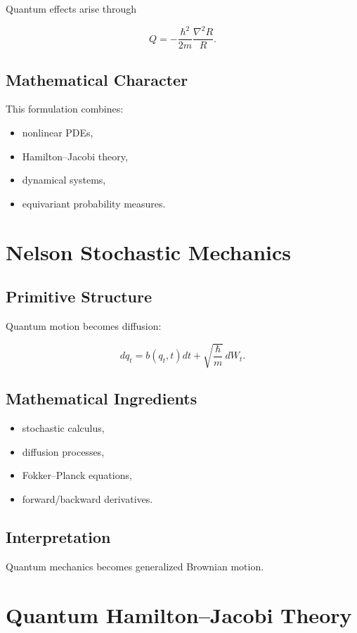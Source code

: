 \documentclass[11pt]{article}
\begin{document}
Quantum effects arise through

\[
Q
=
-
\frac{\hbar^2}{2m}
\frac{\nabla^2R}{R}.
\]

\subsection{Mathematical Character}

This formulation combines:

\begin{itemize}
\item nonlinear PDEs,
\item Hamilton--Jacobi theory,
\item dynamical systems,
\item equivariant probability measures.
\end{itemize}

\section{Nelson Stochastic Mechanics}

\subsection{Primitive Structure}

Quantum motion becomes diffusion:

\[
dq_t
=
b(q_t,t)dt
+
\sqrt{\frac{\hbar}{m}}\, dW_t.
\]

\subsection{Mathematical Ingredients}

\begin{itemize}
\item stochastic calculus,
\item diffusion processes,
\item Fokker--Planck equations,
\item forward/backward derivatives.
\end{itemize}

\subsection{Interpretation}

Quantum mechanics becomes generalized Brownian motion.

\section{Quantum Hamilton--Jacobi Theory}
\end{document}
